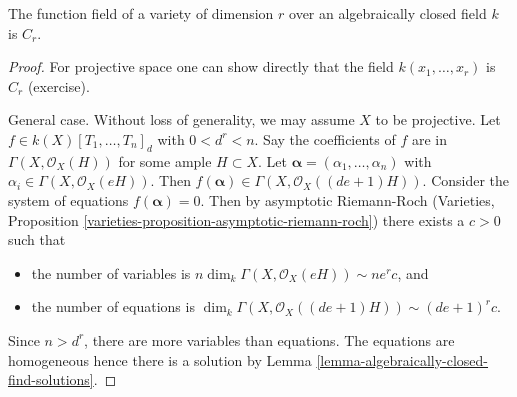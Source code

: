 \begin{theorem}
\label{theorem-tsen}
The function field of a variety of dimension $r$ over an algebraically closed
field $k$ is $C_r$.
\end{theorem}

\begin{proof}
For projective space one can show directly that the field
$k(x_1, \ldots, x_r)$ is $C_r$ (exercise).

\medskip\noindent
General case. Without loss of generality, we may assume $X$ to be projective.
Let $f \in k(X)[T_1, \ldots, T_n]_d$ with $0 < d^r < n$.
Say the coefficients of $f$ are in $\Gamma(X, \mathcal{O}_X(H))$
for some ample $H \subset X$. Let
$\mathbf{\alpha} = (\alpha_1, \ldots, \alpha_n)$ with $\alpha_i \in \Gamma(X,
\mathcal{O}_X(eH))$. Then $f(\mathbf{\alpha}) \in \Gamma(X,
\mathcal{O}_X((de + 1)H))$. Consider the system of equations $f(\mathbf{\alpha})
=0$. Then by asymptotic Riemann-Roch
(Varieties, Proposition \ref{varieties-proposition-asymptotic-riemann-roch})
there exists a $c > 0$ such that
\begin{itemize}
\item the number of variables is
$n\dim_k \Gamma(X, \mathcal{O}_X(eH)) \sim n e^r c$, and
\item the number of equations is
$\dim_k \Gamma(X, \mathcal{O}_X((de + 1)H)) \sim (de + 1)^r c$.
\end{itemize}
Since $n > d^r$, there are more variables than equations. The equations are
homogeneous hence there is a solution by
Lemma \ref{lemma-algebraically-closed-find-solutions}.
\end{proof}